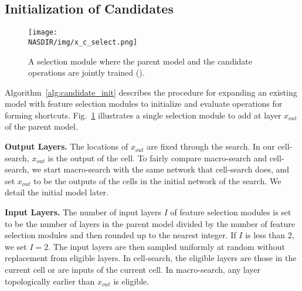 \subsection{Initialization of Candidates}
\label{sec:candidate_init_and_select}

\begin{figure}[t]
\centering
    \texttt{[image: \\NASDIR/img/x\_c\_select.png]}
    \caption{A selection module  where the parent model and the candidate operations are jointly trained (\petridishsoft).}
    \label{fig:x_c_select}
\end{figure}

Algorithm~\ref{alg:candidate_init} describes the procedure for expanding an existing model with feature selection modules to initialize and evaluate operations for forming shortcuts. Fig.~\ref{fig:x_c_select} illustrates a single selection module to add at layer $x_{out}$ of the parent model. 

\textbf{Output Layers.} The locations of $x_{out}$ are fixed through the search. In our cell-search, $x_{out}$ is the output of the cell. To fairly compare macro-search and cell-search, we start macro-search with the same network that cell-search does, and set $x_{out}$ to be the outputs of the cells in the initial network of the search. We detail the initial model later. 

\textbf{Input Layers.} The number of input layers $I$ of feature selection modules is set to be the number of layers in the parent model divided by the number of feature selection modules and then rounded up to the nearest integer. If $I$ is less than $2$, we set $I=2$. The input layers are then sampled uniformly at random without replacement from eligible layers. In cell-search, the eligible layers are those in the current cell or are inputs of the current cell. In macro-search, any layer topologically earlier than $x_{out}$ is eligible. 

